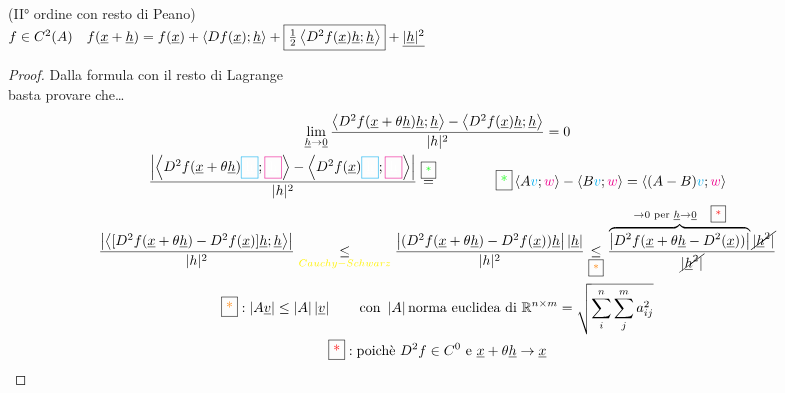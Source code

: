 \documentclass[a4paper, oneside]{article}
\begin{document}
        \begin{theorem}
            (II° ordine con resto di Peano)\\
            $f \in C^2(A) \quad f(\underline{x}+ \underline{h}) = f(\underline{x}) + \left\langle Df(\underline{x}); \underline{h} \right\rangle + \text{\fbox{$\frac{1}{2}\left\langle D^2f(\underline{x})\underline{h};\underline{h} \right\rangle $}} + \underline{ | \underline{h} | ^2}$ 
        \end{theorem}
        \begin{proof}
            Dalla formula con il resto di Lagrange\\
             basta provare che\dots
            \begin{gather*}
                \lim_{\underline{h} \to \underline{0}} \frac{\left\langle D^2f(\underline{x} + \theta \underline{h})\underline{h} ; \underline{h} \right\rangle - \left\langle D^2f(\underline{x})\underline{h} ; \underline{h} \right\rangle }{|h|^2} = 0\\
                \frac{\left\lvert \left\langle D^2f(\underline{x} + \theta \underline{h}) \textcolor{cyan}{\fbox{\textcolor{white}{\underline{h}}}} ; \textcolor{magenta}{\fbox{\textcolor{white}{\underline{h}}}} \right\rangle - \left\langle D^2f(\underline{x})\textcolor{cyan}{\fbox{\textcolor{white}{\underline{h}}}} ; \textcolor{magenta}{\fbox{\textcolor{white}{\underline{h}}}} \right\rangle\right\rvert  }{|h|^2} \overset{\text{\fbox{\textcolor{green}{*}}}}{=} \qquad\qquad \text{\fbox{\textcolor{green}{*}}}\left\langle  A \textcolor{cyan}{v};\textcolor{magenta}{w}\right\rangle - \left\langle B \textcolor{cyan}{v};\textcolor{magenta}{w}\right\rangle = \left\langle (A-B)\textcolor{cyan}{v};\textcolor{magenta}{w}\right\rangle\\
                \frac{\left\lvert \left\langle [D^2 f(\underline{x} + \theta \underline{h}) - D^2 f(\underline{x})] \underline{h} ; \underline{h} \right\rangle \right\rvert }{|h|^2} \underset{\textcolor{yellow}{Cauchy-Schwarz}}{\leq} \frac{\left\lvert (D^2 f(\underline{x} + \theta \underline{h}) - D^2 f(\underline{x}))  \underline{h} \right\rvert \left\lvert \underline{h}\right\rvert }{|h|^2} \underset{\text{\fbox{\textcolor{orange}{*}}}}{\leq} \frac{\overbrace{\left\lvert D^2f(\underline{x}+ \theta \underline{h} - D^2(\underline{x}))\right\rvert}^{\to 0 \text{ per } \underline{h} \to \underline{0} \quad \text{\fbox{\textcolor{red}{*}}}} \cancel{|\underline{h}^2|}}{\cancel{|\underline{h}^2|}}\\
                \text{\fbox{\textcolor{orange}{*}}}: \left\lvert A \underline{v} \right\rvert \leq \left\lvert A \right\rvert \left\lvert \underline{v} \right\rvert \qquad \text{con }\left\lvert A \right\rvert \text{norma euclidea di }\mathbb{R}^{n\times m} =\sqrt{\sum_{i}^{n}\sum_{j}^{m} a^2_{ij} }   \\
                \text{\fbox{\textcolor{red}{*}}}: \text{poichè } D^2f\in C^0 \text{ e } \underline{x} + \theta\underline{h} \to \underline{x}
            \end{gather*}
        \end{proof}
\end{document}
